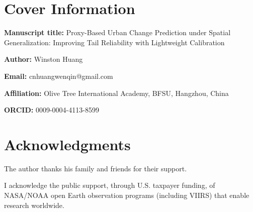 \documentclass[12pt]{article}
\begin{document}
\section*{Cover Information}

\textbf{Manuscript title:} Proxy-Based Urban Change Prediction under Spatial Generalization: Improving Tail Reliability with Lightweight Calibration

\textbf{Author:} Winston Huang

\textbf{Email:} cnhuangwenqin@gmail.com

\textbf{Affiliation:} Olive Tree International Academy, BFSU, Hangzhou, China

\textbf{ORCID:} 0009-0004-4113-8599

\section*{Acknowledgments}

The author thanks his family and friends for their support.

I acknowledge the public support, through U.S. taxpayer funding, of NASA/NOAA open Earth observation programs (including VIIRS) that enable research worldwide.
\end{document}
